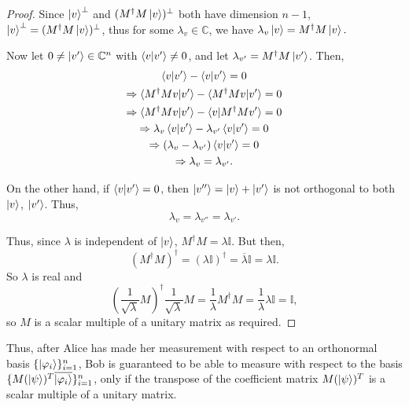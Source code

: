\begin{proof}
\noindent
Since $\ket{v}^\perp$ and $(M^\dagger M\ket{v})^\perp$ both have dimension $n-1$, $\ket{v}^\perp = (M^\dagger M\ket{v})^\perp$, thus for some $\lambda_v \in \mathbb{C}$, we have $\lambda_v \ket{v} = M^\dagger M \ket{v}.$

Now let $0 \neq \ket{v'} \in \mathbb{C}^n$ with $\braket{v|v'} \neq 0$, and let ${\lambda}_{v'}=M^\dagger M \ket{v'}$.  Then,
\begin{gather*}
\braket{v|v'}-\braket{v|v'}=0\\
\Rightarrow \braket{M^\dagger M v|v'}-\braket{M^\dagger M v|v'}=0\\
\Rightarrow \braket{M^\dagger M v|v'}-\braket{v|M^\dagger M v'}=0\\
\Rightarrow \lambda_v \braket{v|v'}-\lambda_{v'} \braket{v|v'}=0\\
\Rightarrow (\lambda_v -\lambda_{v'}) \braket{v|v'}=0\\
\Rightarrow  \lambda_v = \lambda_{v'}.
\end{gather*}

On the other hand, if $\braket{v|v'}=0$, then $ \ket{v''}=\ket{v}+\ket{v'}$ is not orthogonal to both $\ket{v}$, $\ket{v'}$.  Thus, 
$$ {\lambda}_{v}=\lambda_{v''}=\lambda_{v'}.$$

Thus, since $\lambda$ is independent of $\ket{v}$, $M^\dagger M = \lambda \mathbb{I}$.  But then,
\begin{equation*}
{(M^\dagger M)}^\dagger={(\lambda \mathbb{I})}^\dagger=\overline{\lambda} \mathbb{I} =\lambda \mathbb{I}.
\end{equation*}
So $\lambda$ is real and  
\begin{equation*}
{(\frac{1}{\sqrt{\lambda}}M)}^\dagger \frac{1}{\sqrt{\lambda}}M=\frac{1}{\lambda}M^\dagger M=\frac{1}{\lambda}\lambda\mathbb{I}=\mathbb{I},
\end{equation*}
so $M$ is a scalar multiple of a unitary matrix as required.
\end{proof}



Thus, after Alice has made her measurement with respect to an orthonormal basis $\{\ket{\varphi_i}\}_{i=1}^n$, Bob is guaranteed to be able to measure with respect to the basis $\{M(\ket{\psi})^T {\overline{\ket{\varphi_i}}}\}_{i=1}^n$, only if the transpose of the coefficient matrix $M(\ket{\psi})^T$ is a scalar multiple of a unitary matrix. 

